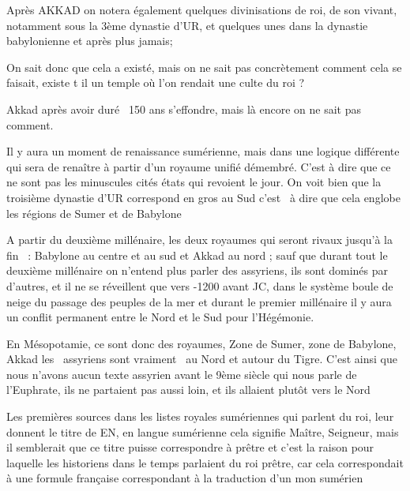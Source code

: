 \documentclass[a4paper]{article}
\begin{document}
{
Après AKKAD on notera également quelques divinisations de roi, de son
vivant, notamment sous la 3ème dynastie d'UR, et quelques unes dans la
dynastie babylonienne et après plus jamais;}

{
On sait donc que cela a existé, mais on ne sait pas concrètement comment
cela se faisait, existe t il un temple où l'on rendait une culte du roi
?}

{
Akkad après avoir duré \ 150 ans s'effondre, mais là encore on ne sait
pas comment.}


\bigskip

{
Il y aura un moment de renaissance sumérienne, mais dans une logique
différente qui sera de renaître à partir d'un royaume unifié démembré.
C'est à dire que ce ne sont pas les minuscules cités états qui revoient
le jour. On voit bien que la troisième dynastie d'UR correspond en gros
au Sud c'est \ à dire que cela englobe les régions de Sumer et de
Babylone}


\bigskip

{
A partir du deuxième millénaire, les deux royaumes qui seront rivaux
jusqu'à la fin \ : Babylone au centre et au sud et Akkad au nord ; sauf
que durant tout le deuxième millénaire on n'entend plus parler des
assyriens, ils sont dominés par d'autres, et il ne se réveillent que
vers -1200 avant JC, dans le système boule de neige du passage des
peuples de la mer et durant le premier millénaire il y aura un conflit
permanent entre le Nord et le Sud pour l'Hégémonie.}


\bigskip


\bigskip

{
En Mésopotamie, ce sont donc des royaumes, Zone de Sumer, zone de
Babylone, Akkad les \ assyriens sont vraiment \ au Nord et autour du
Tigre. C'est ainsi que nous n'avons aucun texte assyrien avant le 9ème
siècle qui nous parle de l'Euphrate, ils ne partaient pas aussi loin,
et ils allaient plutôt vers le Nord}


\bigskip


\bigskip


\bigskip

{
Les premières sources dans les listes royales sumériennes qui parlent du
roi, leur donnent le titre de EN, en langue sumérienne cela signifie
Maître, Seigneur, mais il semblerait que ce titre puisse correspondre à
prêtre et c'est la raison pour laquelle les historiens dans le temps
parlaient du roi prêtre, car cela correspondait à une formule française
correspondant à la traduction d'un mon sumérien }
\end{document}
